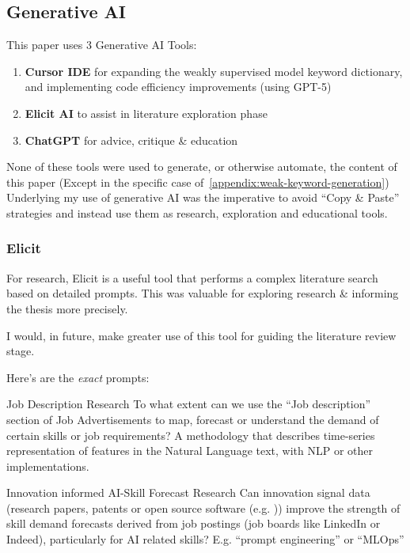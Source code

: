 \begin{appendices}
  \chapter{}
  \section{Generative AI}
  This paper uses 3 Generative AI Tools:

  \begin{enumerate}
    \item \textbf{Cursor IDE} for expanding the weakly supervised model keyword dictionary, and implementing code efficiency improvements (using GPT-5) \cite{cursor2025,openai2025chatgpt}
    \item \textbf{Elicit AI} to assist in literature exploration phase \cite{elicit}
    \item \textbf{ChatGPT} for advice, critique \& education \cite{openai2025chatgpt}
  \end{enumerate}
  None of these tools were used to generate, or otherwise automate, the content of this paper (Except in the specific case of~\ref{appendix:weak-keyword-generation})
  Underlying my use of generative AI was the imperative to avoid ``Copy \& Paste'' strategies and instead use them as research, exploration and educational tools.

  \subsection{Elicit}
  For research, Elicit is a useful tool that performs a complex literature search based on detailed prompts.
  This was valuable for exploring research \& informing the thesis more precisely.

  I would, in future, make greater use of this tool for guiding the literature review stage.

  Here's are the \emph{exact} prompts:
  \begin{prompt}{Job Description Research}
    To what extent can we use the ``Job description'' section of Job Advertisements to map, forecast or understand the demand of certain skills or job requirements? A methodology that describes time-series representation of features in the Natural Language text, with NLP or other implementations.
  \end{prompt}

  \begin{prompt}{Innovation informed AI-Skill Forecast Research}
    Can innovation signal data (research papers, patents or open source software (e.g. \gh{})) improve the strength of skill demand forecasts derived from job postings (job boards like LinkedIn or Indeed), particularly for AI related skills? E.g. ``prompt engineering'' or ``MLOps''
  \end{prompt}


\end{appendices}
